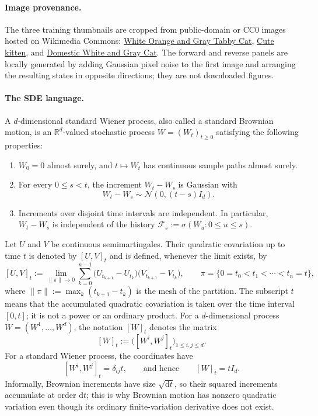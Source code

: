 \documentclass[11pt,a4paper]{article}
\theoremstyle{definition}
\begin{document}
\paragraph{Image provenance.}
The three training thumbnails are cropped from public-domain or CC0 images hosted on
Wikimedia Commons: \href{https://commons.wikimedia.org/wiki/File:White_Orange_and_Gray_Tabby_Cat.jpg}{White Orange and Gray Tabby Cat},
\href{https://commons.wikimedia.org/wiki/File:Cute_kitten.jpg}{Cute kitten}, and
\href{https://commons.wikimedia.org/wiki/File:Domestic_White_and_Gray_Cat.JPG}{Domestic White and Gray Cat}.
The forward and reverse panels are locally generated by adding Gaussian pixel noise to
the first image and arranging the resulting states in opposite directions; they are not
downloaded figures.

\paragraph{The SDE language.}

\begin{definition}
A $d$-dimensional standard Wiener process, also called a standard Brownian motion, is an
$\mathbb{R}^d$-valued stochastic process
$W=(W_t)_{t\geq 0}$ satisfying the following properties:

\begin{enumerate}
    \item $W_0=0$ almost surely, and $t\mapsto W_t$ has continuous sample paths almost
    surely.
    \item For every $0\leq s<t$, the increment $W_t-W_s$ is Gaussian with
    \[
    W_t-W_s\sim\mathcal{N}\left(0,(t-s)I_d\right).
    \]
    \item Increments over disjoint time intervals are independent. In particular,
    $W_t-W_s$ is independent of the history
    $\mathcal{F}_s:=\sigma(W_u:0\leq u\leq s)$.
\end{enumerate}
\end{definition}

\begin{definition}
Let $U$ and $V$ be continuous semimartingales. Their quadratic covariation up to time
$t$ is denoted by $[U,V]_t$ and is defined, whenever the limit exists, by
\[
[U,V]_t
:=
\lim_{\lVert\pi\rVert\to0}
\sum_{k=0}^{n-1}
\bigl(U_{t_{k+1}}-U_{t_k}\bigr)
\bigl(V_{t_{k+1}}-V_{t_k}\bigr),
\qquad
\pi=\{0=t_0<t_1<\cdots<t_n=t\},
\]
where $\lVert\pi\rVert:=\max_k(t_{k+1}-t_k)$ is the mesh of the partition. The
subscript $t$ means that the accumulated quadratic covariation is taken over the time
interval $[0,t]$; it is not a power or an ordinary product. For a $d$-dimensional
process $W=(W^1,\ldots,W^d)$, the notation $[W]_t$ denotes the matrix
\[
[W]_t:=\bigl([W^i,W^j]_t\bigr)_{1\leq i,j\leq d}.
\]
For a standard Wiener process, the coordinates have
\[
[W^i,W^j]_t=\delta_{ij}t,
\qquad\text{and hence}\qquad
[W]_t=tI_d.
\]
Informally, Brownian increments have size $\sqrt{\mathrm{d}t}$, so their squared
increments accumulate at order $\mathrm{d}t$; this is why Brownian motion has nonzero
quadratic variation even though its ordinary finite-variation derivative does not exist.
\end{definition}
\end{document}
